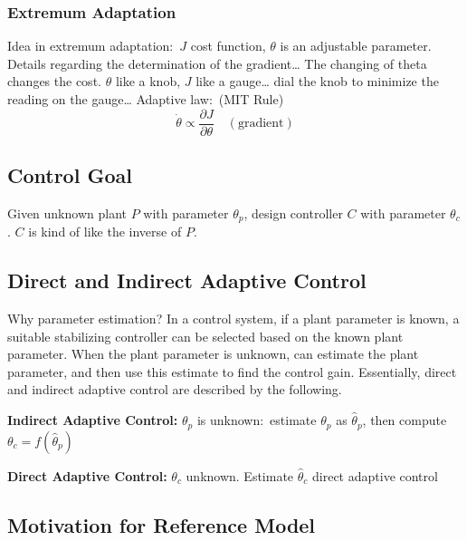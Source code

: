 \subsubsection{Extremum Adaptation}

Idea in extremum adaptation:\ $J$ cost function, $\theta$ is an adjustable parameter.
Details regarding the determination of the gradient\ldots
The changing of theta changes the cost.
$\theta$ like a knob, $J$ like a gauge\ldots
dial the knob to minimize the reading on the gauge\ldots
Adaptive law:\ (MIT Rule)
\begin{equation*}
  \dot{\theta}\propto\frac{\partial{}J}{\partial\theta}\quad(\text{gradient})
\end{equation*}

\subsection{Control Goal}

Given unknown plant $P$ with parameter $\theta_{p}$, design controller $C$ with parameter $\theta_{c}$.
$C$ is kind of like the inverse of $P$.

\subsection{Direct and Indirect Adaptive Control}

Why parameter estimation? In a control system, if a plant parameter is known, a suitable stabilizing controller can be selected based on the known plant parameter.
When the plant parameter is unknown, can estimate the plant parameter, and then use this estimate to find the control gain.
Essentially, direct and indirect adaptive control are described by the following.

\textbf{Indirect Adaptive Control:} $\theta_{p}$ is unknown:\ estimate $\theta_{p}$ as $\hat{\theta}_{p}$, then compute $\theta_{c}=f(\hat{\theta}_{p})$

\textbf{Direct Adaptive Control:} $\theta_{c}$ unknown.
Estimate $\hat{\theta}_{c}$ \textemdash{} direct adaptive control

\subsection{Motivation for Reference Model}

